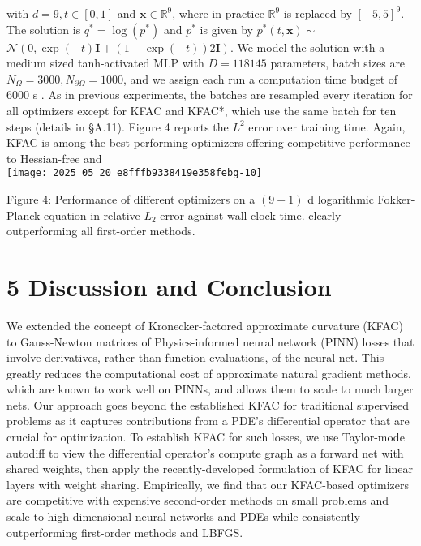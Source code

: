 \documentclass[10pt]{article}
\begin{document}
with $d=9, t \in[0,1]$ and $\boldsymbol{x} \in \mathbb{R}^{9}$, where in practice $\mathbb{R}^{9}$ is replaced by $[-5,5]^{9}$. The solution is $q^{*}=\log \left(p^{*}\right)$ and $p^{*}$ is given by $p^{*}(t, \boldsymbol{x}) \sim$ $\mathcal{N}(0, \exp (-t) \boldsymbol{I}+(1-\exp (-t)) 2 \boldsymbol{I})$. We model the solution with a medium sized tanh-activated MLP with $D=118145$ parameters, batch sizes are $N_{\Omega}=3000, N_{\partial \Omega}=1000$, and we assign each run a computation time budget of 6000 s . As in previous experiments, the batches are resampled every iteration for all optimizers except for KFAC and KFAC*, which use the same batch for ten steps (details in §A.11). Figure 4 reports the $L^{2}$ error over training time. Again, KFAC is among the best performing optimizers offering competitive performance to Hessian-free and\\
\texttt{[image: 2025\_05\_20\_e8fffb9338419e358febg-10]}

Figure 4: Performance of different optimizers on a $(9+1)$ d logarithmic Fokker-Planck equation in relative $L_{2}$ error against wall clock time. clearly outperforming all first-order methods.

\section*{5 Discussion and Conclusion}
We extended the concept of Kronecker-factored approximate curvature (KFAC) to Gauss-Newton matrices of Physics-informed neural network (PINN) losses that involve derivatives, rather than function evaluations, of the neural net. This greatly reduces the computational cost of approximate natural gradient methods, which are known to work well on PINNs, and allows them to scale to much larger nets. Our approach goes beyond the established KFAC for traditional supervised problems as it captures contributions from a PDE's differential operator that are crucial for optimization. To establish KFAC for such losses, we use Taylor-mode autodiff to view the differential operator's compute graph as a forward net with shared weights, then apply the recently-developed formulation of KFAC for linear layers with weight sharing. Empirically, we find that our KFAC-based optimizers are competitive with expensive second-order methods on small problems and scale to high-dimensional neural networks and PDEs while consistently outperforming first-order methods and LBFGS.
\end{document}
